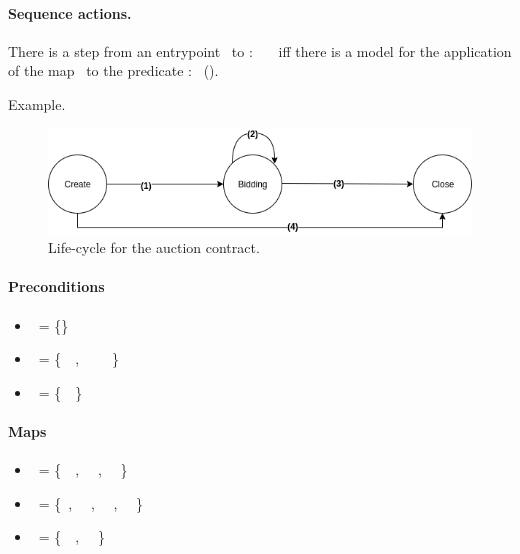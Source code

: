 \documentclass[runningheads]{llncs}
\begin{document}
\paragraph{Sequence actions.}
\begin{definition}
There is a step from an entrypoint \A\ to \B: \A\ \SRightarrow\ \B\  iff  there is a model for the application of the map \Overline\MAPA\ to the predicate \PREDICATEB: \Models\ \Overline\MAPA(\PREDICATEB).
\end{definition}

Example.

\begin{figure}[h]
\center
\includegraphics[width= 10 cm]{life-cycle-1}
\caption{Life-cycle for the auction contract.}
\label{fca1}
\end{figure} 

\paragraph{Preconditions}
\begin{itemize}
\item[] \PCreate\ = \{\EMPTY\} 
\item[] \PBidding\ = \{\AuctionOpen\ \EQUAL\ \TRUE, \AMOUNT\ \MORE\ \BALANCE\ \MINUS\ \AMOUNT\} 
\item[] \PClose\ = \{\AuctionOpen\ \EQUAL\ \TRUE\}
\end{itemize}


\paragraph{Maps}
\begin{itemize}
\item[] \Overline\MapCreate\ = \{\AuctionOpen\ \Mapsto\ \TRUE,  \AuctionBidder\ \Mapsto\ \SENDER, \BALANCE\ \Mapsto\ \ZERO\}
\item[] \Overline\MapBidding\ = \{\AuctionOwner \Mapsto\ \AuctionOwner, \AuctionOpen\ \Mapsto\ \TRUE,  \AuctionBidder\ \Mapsto\ \SENDER, \BALANCE\ \Mapsto\  \AMOUNT\}
\item[] \Overline\MapClose\ = \{\AuctionOpen\ \Mapsto\ \FALSE, \BALANCE\ \Mapsto\ \ZERO\}
\end{itemize}
\end{document}
